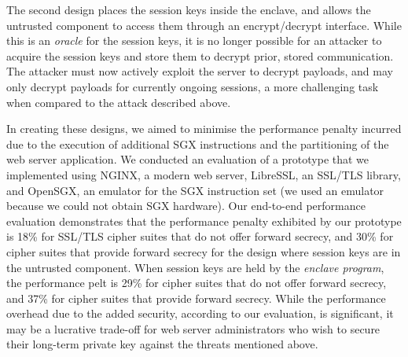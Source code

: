 \documentclass[../main.tex]{subfiles}
\begin{document}
The second design places the session keys inside the enclave, and
allows the untrusted component to access them through an
encrypt/decrypt interface. While this is an \textit{oracle} for the
session keys, it is no longer possible for an attacker to acquire the
session keys and store them to decrypt prior, stored communication.
The attacker must now actively exploit the server to decrypt payloads,
and may only decrypt payloads for currently ongoing sessions, a more
challenging task when compared to the attack described above.

In creating these designs, we aimed to minimise the performance
penalty incurred due to the execution of additional SGX instructions
and the partitioning of the web server application. We conducted an
evaluation of a prototype that we implemented using NGINX, a modern
web server, LibreSSL, an SSL/TLS library, and OpenSGX, an emulator for
the SGX instruction set (we used an emulator because we could not
obtain SGX hardware). Our end-to-end performance evaluation
demonstrates that the performance penalty exhibited by our prototype
is 18\% for SSL/TLS cipher suites that do not offer forward secrecy,
and 30\% for cipher suites that provide forward secrecy for the design
where session keys are in the untrusted component. When session keys
are held by the \textit{enclave program}, the performance pelt is 29\%
for cipher suites that do not offer forward secrecy, and 37\% for
cipher suites that provide forward secrecy. While the performance
overhead due to the added security, according to our evaluation, is
significant, it may be a lucrative trade-off for web server
administrators who wish to secure their long-term private key against
the threats mentioned above.
\end{document}
